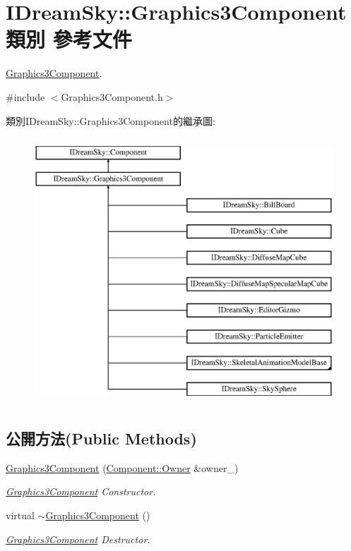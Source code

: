 \hypertarget{class_i_dream_sky_1_1_graphics3_component}{}\section{I\+Dream\+Sky\+:\+:Graphics3\+Component 類別 參考文件}
\label{class_i_dream_sky_1_1_graphics3_component}


\hyperlink{class_i_dream_sky_1_1_graphics3_component}{Graphics3\+Component}.  




{\ttfamily \#include $<$Graphics3\+Component.\+h$>$}

類別\+I\+Dream\+Sky\+:\+:Graphics3\+Component的繼承圖\+:\begin{figure}[H]
\begin{center}
\leavevmode
\includegraphics[height=10.000000cm]{class_i_dream_sky_1_1_graphics3_component}
\end{center}
\end{figure}
\subsection*{公開方法(Public Methods)}
\begin{DoxyCompactItemize}
\item 
\hyperlink{class_i_dream_sky_1_1_graphics3_component_a1bbcc164ca9180c75ba00ce80a20624d}{Graphics3\+Component} (\hyperlink{class_i_dream_sky_1_1_component_1_1_owner}{Component\+::\+Owner} \&owner\+\_\+)
\begin{DoxyCompactList}\small\item\em \hyperlink{class_i_dream_sky_1_1_graphics3_component}{Graphics3\+Component} Constructor. \end{DoxyCompactList}\item 
virtual \hyperlink{class_i_dream_sky_1_1_graphics3_component_a96ba278043f1bb3c3a6caeb4e3a47e3b}{$\sim$\+Graphics3\+Component} ()
\begin{DoxyCompactList}\small\item\em \hyperlink{class_i_dream_sky_1_1_graphics3_component}{Graphics3\+Component} Destructor. \end{DoxyCompactList}\end{DoxyCompactItemize}


